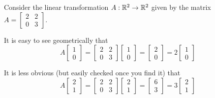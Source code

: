 \begin{observation}
Consider the linear transformation \(A : \mathbb{R}^2 \rightarrow \mathbb{R}^2\) 
given by the matrix \(A = \begin{bmatrix} 2 & 2 \\ 0 & 3 \end{bmatrix}\).

\begin{center}
\end{center}
It is easy to see geometrically that
\[
  A\begin{bmatrix}1 \\ 0 \end{bmatrix} = 
  \begin{bmatrix} 2 & 2 \\ 0 & 3 \end{bmatrix}\begin{bmatrix}1 \\ 0 \end{bmatrix}=
  \begin{bmatrix}2 \\ 0 \end{bmatrix}= 
  2 \begin{bmatrix}1 \\ 0 \end{bmatrix}
\]

It is less obvious (but easily checked once you find it) that
\[
  A\begin{bmatrix} 2 \\ 1 \end{bmatrix} = 
  \begin{bmatrix} 2 & 2 \\ 0 & 3 \end{bmatrix}\begin{bmatrix}2 \\ 1 \end{bmatrix}=
  \begin{bmatrix} 6 \\ 3 \end{bmatrix} = 
  3\begin{bmatrix} 2 \\ 1 \end{bmatrix}
\]
\end{observation}

